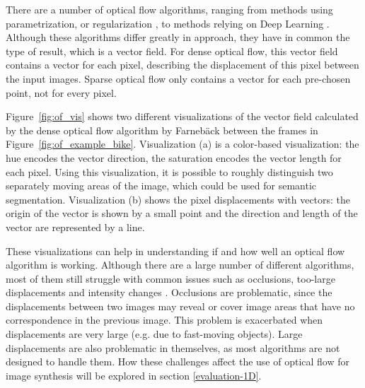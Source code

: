 There are a number of optical flow algorithms, ranging from methods using parametrization, or regularization \cite{of-survey}, to methods relying on Deep Learning \cite{of-deep}. Although these algorithms differ greatly in approach, they have in common the type of result, which is a vector field. For dense optical flow, this vector field contains a vector for each pixel, describing the displacement of this pixel between the input images. Sparse optical flow only contains a vector for each pre-chosen point, not for every pixel.

Figure~\ref{fig:of_vis} shows two different visualizations of the vector field calculated by the dense optical flow algorithm by Farneb\"ack \cite{farneback} between the frames in Figure~\ref{fig:of_example_bike}. Visualization (a) is a color-based visualization: the hue encodes the vector direction, the saturation encodes the vector length for each pixel. Using this visualization, it is possible to roughly distinguish two separately moving areas of the image, which could be used for semantic segmentation. Visualization (b) shows the pixel displacements with vectors: the origin of the vector is shown by a small point and the direction and length of the vector are represented by a line.

These visualizations can help in understanding if and how well an optical flow algorithm is working. Although there are a large number of different algorithms, most of them still struggle with common issues such as occlusions, too-large displacements and intensity changes \cite{of-survey}. Occlusions are problematic, since the displacements between two images may reveal or cover image areas that have no correspondence in the previous image. This problem is exacerbated when displacements are very large (e.g. due to fast-moving objects). Large displacements are also problematic in themselves, as most algorithms are not designed to handle them. How these challenges affect the use of optical flow for image synthesis will be explored in section \ref{evaluation-1D}.

